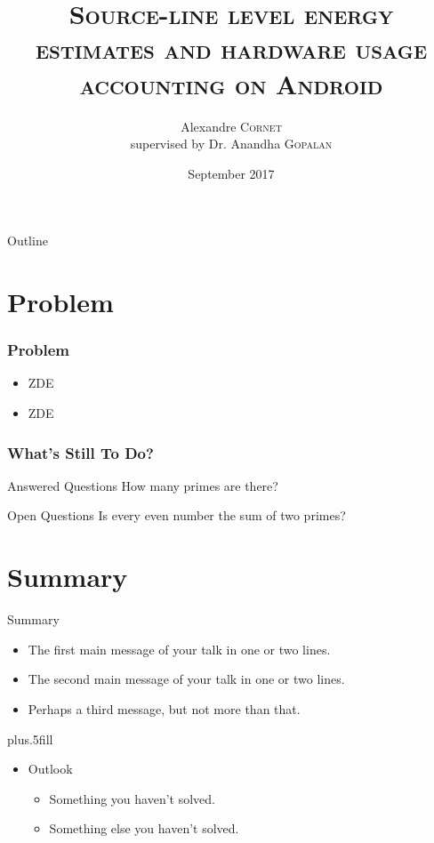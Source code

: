 
\title{\textsc{Source-line level energy estimates and hardware usage accounting on Android}}
\author{Alexandre \textsc{Cornet}\\ {\footnotesize supervised by Dr. Anandha \textsc{Gopalan}}}
\date{September 2017}

\begin{frame}
\titlepage
\end{frame}
%
\begin{frame}{Outline}
\tableofcontents%
\end{frame}
%
\section{Problem}
\begin{frame}
\frametitle{Problem}
\begin{itemize}
\item ZDE
\item ZDE
\end{itemize}
\end{frame}
%
\begin{frame}
\frametitle{What's Still To Do?}
\begin{block}{Answered Questions}
How many primes are there?
\end{block}
\begin{block}{Open Questions}
Is every even number the sum of two primes?
\end{block}
\end{frame}
%

\section*{Summary}
\begin{frame}{Summary}
\begin{itemize}
\item
The \alert{first main message} of your talk in one or two lines.
\item
The \alert{second main message} of your talk in one or two lines.
\item
Perhaps a \alert{third message}, but not more than that.
\end{itemize}

\vskip0pt plus.5fill
\begin{itemize}
\item
Outlook
\begin{itemize}
\item
Something you haven't solved.
\item
Something else you haven't solved.
\end{itemize}
\end{itemize}
\end{frame}

